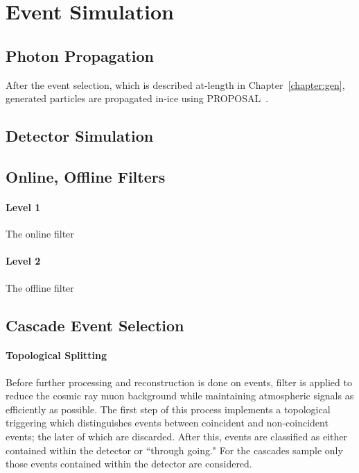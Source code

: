 \documentclass[main.tex]{subfiles}
\begin{document}
\section{Event Simulation}

\subsection{Photon Propagation}

After the event selection, which is described at-length in Chapter~\ref{chapter:gen}, generated particles are propagated in-ice using PROPOSAL~\cite{Koehne:2013gpa}. 

\subsection{Detector Simulation}

\subsection{Online, Offline Filters}

\paragraph{Level 1}

The online filter

\paragraph{Level 2}

The offline filter 


\subsection{Cascade Event Selection}

\paragraph{Topological Splitting}

Before further processing and reconstruction is done on events, filter is applied to reduce the cosmic ray muon background while maintaining atmospheric signals as efficiently as possible. 
The first step of this process implements a topological triggering which distinguishes events between coincident and non-coincident events; the later of which are discarded. 
After this, events are classified as either contained within the detector or ``through going." For the cascades sample only those events contained within the detector are considered. 
\end{document}
